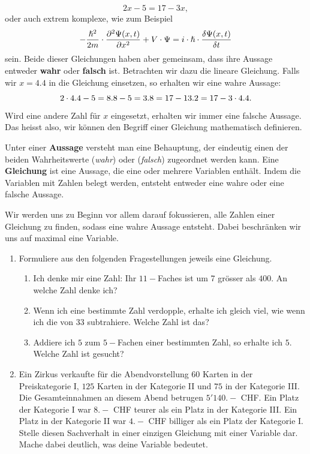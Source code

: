 \documentclass[11pt,oneside]{article}
\begin{document}
    \[2x-5=17-3x,\]
    oder auch extrem komplexe, wie zum Beispiel
    \[-\frac{\hslash^2}{2m}\cdot\frac{\partial^2\Psi(x,t)}{\partial x^2}+V\cdot\Psi=i\cdot\hslash\cdot\frac{\delta\Psi(x,t)}{\delta t}\]
    sein. Beide dieser Gleichungen haben aber gemeinsam, dass ihre Aussage entweder \textbf{wahr} oder \textbf{falsch} ist. Betrachten wir dazu die lineare Gleichung. Falls wir $x=4.4$ in die Gleichung einsetzen, so erhalten wir eine wahre Aussage:
    \[2\cdot4.4-5=8.8-5=3.8=17-13.2=17-3\cdot4.4.\]
    Wird eine andere Zahl für $x$ eingesetzt, erhalten wir immer eine falsche Aussage. Das heisst also, wir können den Begriff einer Gleichung mathematisch definieren.
    \begin{definition}
        Unter einer \textbf{Aussage} versteht man eine Behauptung, der eindeutig einen der beiden Wahrheitswerte (\textit{wahr}) oder (\textit{falsch}) zugeordnet werden kann.\newline
        Eine \textbf{Gleichung} ist eine Aussage, die eine oder mehrere Variablen enthält. Indem die Variablen mit Zahlen belegt werden, entsteht entweder eine wahre oder eine falsche Aussage.
    \end{definition}
    Wir werden uns zu Beginn vor allem darauf fokussieren, alle Zahlen einer Gleichung zu finden, sodass eine wahre Aussage entsteht. Dabei beschränken wir uns auf maximal eine Variable.
    \begin{aufgabe}
        \begin{enumerate} %
            \item Formuliere aus den folgenden Fragestellungen jeweils eine Gleichung.
            \begin{enumerate}[label=\alph*)]
                \item Ich denke mir eine Zahl: Ihr $11-$Faches ist um 7 grösser als $400$. An welche Zahl denke ich?
                \item Wenn ich eine bestimmte Zahl verdopple, erhalte ich gleich viel, wie wenn ich die von $33$ subtrahiere. Welche Zahl ist das?
                \item Addiere ich $5$ zum $5-$Fachen einer bestimmten Zahl, so erhalte ich $5$. Welche Zahl ist gesucht?
            \end{enumerate}
            \item Ein Zirkus verkaufte für die Abendvorstellung $60$ Karten in der Preiskategorie I, $125$ Karten in der Kategorie II und $75$ in der Kategorie III. Die Gesamteinnahmen an diesem Abend betrugen $5'140.-$ CHF. Ein Platz der Kategorie I war $8.-$ CHF teurer als ein Platz in der Kategorie III. Ein Platz in der Kategorie II war $4.-$ CHF billiger als ein Platz der Kategorie I. Stelle diesen Sachverhalt in einer einzigen Gleichung mit einer Variable dar. Mache dabei deutlich, was deine Variable bedeutet.
        \end{enumerate}
    \end{aufgabe}
\end{document}
